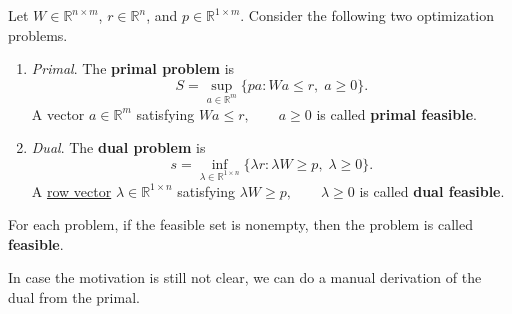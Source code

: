 	\begin{definition}
		\label{def:primal_dual}
		Let $W \in \mathbb{R}^{n \times m}$, $r \in \mathbb{R}^n$, and $p \in \mathbb{R}^{1 \times m}$. Consider the following two optimization problems.
		\begin{enumerate}
			\item \textit{Primal}. The \textbf{primal problem} is
				\begin{equation}
					S = \sup_{a \in \mathbb{R}^m} \{pa \colon Wa \leq r,\; a \geq 0\}.
				\end{equation}
				A vector $a \in \mathbb{R}^m$ satisfying $Wa \leq r,\qquad a \geq 0$ is called \textbf{primal feasible}.

			\item \textit{Dual}. The \textbf{dual problem} is
				\begin{equation}
					s = \inf_{\lambda \in \mathbb{R}^{1 \times n}} \{\lambda r \colon \lambda W \geq p,\; \lambda \geq 0\}.
				\end{equation}
				A \hyperref[lin-def:row-vector]{row vector} $\lambda \in \mathbb{R}^{1 \times n}$ satisfying $\lambda W \geq p,\qquad \lambda \geq 0$ is called \textbf{dual feasible}.
		\end{enumerate}
		For each problem, if the feasible set is nonempty, then the problem is called \textbf{feasible}. 
	\end{definition}

	In case the motivation is still not clear, we can do a manual derivation of the dual from the primal. 

